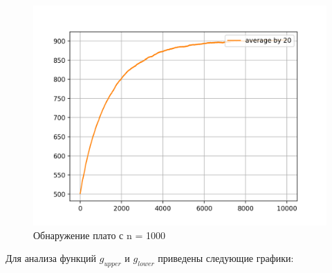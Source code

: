 \documentclass[times,specification,annotation]{itmo-student-thesis}
\begin{document}
    \begin{figure}[H]
        \centering
        \caption{Обнаружение плато с n = 1000}
        \label{pic:sublists-metafile}
        \includegraphics[scale=0.8]{plot_d_averaged_1000_1_20_10000.png}
    \end{figure}


    Для анализа функций $g_{upper}$ и $g_{lower}$ приведены следующие графики:
\end{document}
